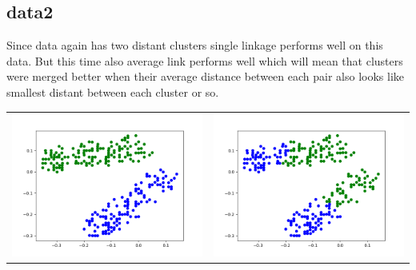 \documentclass{article}
\begin{document}
\subsection{data2}
Since data again has two distant clusters single linkage performs well on this data. But this time also average link performs well which will mean that clusters were merged better when their average distance
between each pair also looks like smallest distant between each cluster or so.\\
\begin{tabular}{c|c}

\includegraphics[scale=0.4]{hac_images/data2single.png}&\includegraphics[scale=0.4]{hac_images/data2complete.png}\\

\end{tabular}
\end{document}
